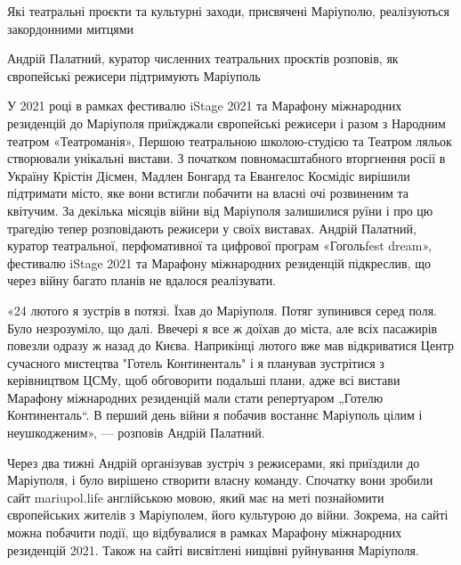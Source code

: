  
 
 
 
 

Які театральні проєкти та культурні заходи, присвячені Маріуполю, реалізуються закордонними митцями

Андрій Палатний, куратор численних театральних проєктів розповів, як європейські режисери підтримують Маріуполь

У 2021 році в рамках фестивалю iStage 2021 та Марафону міжнародних резиденцій
до Маріуполя приїжджали європейські режисери і разом з Народним театром
«Театроманія», Першою театральною школою-студією та Театром ляльок створювали
унікальні вистави. З початком повномасштабного вторгнення росії в Україну
Крістін Дісмен, Мадлен Бонгард та Евангелос Космідіс вирішили підтримати місто,
яке вони встигли побачити на власні очі розвиненим та квітучим. За декілька
місяців війни від Маріуполя залишилися руїни і про цю трагедію тепер
розповідають режисери у своїх виставах. Андрій Палатний, куратор театральної,
перфомативної та цифрової програм «Гогольfest dream», фестивалю iStage 2021 та
Марафону міжнародних резиденцій підкреслив, що через війну багато планів не
вдалося реалізувати.

«24 лютого я зустрів в потязі. Їхав до Маріуполя. Потяг зупинився серед поля.
Було незрозуміло, що далі. Ввечері я все ж доїхав до міста, але всіх пасажирів
повезли одразу ж назад до Києва. Наприкінці лютого вже мав відкриватися Центр
сучасного мистецтва "Готель Континенталь" і я планував зустрітися з
керівництвом ЦСМу, щоб обговорити подальші плани, адже всі вистави Марафону
міжнародних резиденцій мали стати репертуаром „Готелю Континенталь“. В перший
день війни я побачив востаннє Маріуполь цілим і неушкодженим», — розповів
Андрій Палатний.

Через два тижні Андрій організував зустріч з режисерами, які приїздили до
Маріуполя, і було вирішено створити власну команду. Спочатку вони зробили сайт
mariupol.life англійською мовою, який має на меті познайомити європейських
жителів з Маріуполем, його культурою до війни. Зокрема, на сайті можна побачити
події, що відбувалися в рамках Марафону міжнародних резиденцій 2021. Також на
сайті висвітлені нищівні руйнування Маріуполя.

